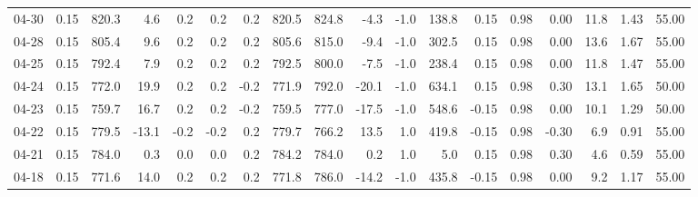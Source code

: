 \begin{threeparttable}
{\begin{tabular}{lrrrrrrrrrrrrrrrrr}
  04-30 &     0.15 & 820.3 &               4.6 &               0.2 &                0.2 &                0.2 & 820.5 & 824.8 &       -4.3 &                     -1.0 &               138.8 &       0.15 &      0.98 &           0.00 &             11.8 &            1.43 &                  55.00 \\
  04-28 &     0.15 & 805.4 &               9.6 &               0.2 &                0.2 &                0.2 & 805.6 & 815.0 &       -9.4 &                     -1.0 &               302.5 &       0.15 &      0.98 &           0.00 &             13.6 &            1.67 &                  55.00 \\
  04-25 &     0.15 & 792.4 &               7.9 &               0.2 &                0.2 &                0.2 & 792.5 & 800.0 &       -7.5 &                     -1.0 &               238.4 &       0.15 &      0.98 &           0.00 &             11.8 &            1.47 &                  55.00 \\
  04-24 &     0.15 & 772.0 &              19.9 &               0.2 &                0.2 &               -0.2 & 771.9 & 792.0 &      -20.1 &                     -1.0 &               634.1 &       0.15 &      0.98 &           0.30 &             13.1 &            1.65 &                  50.00 \\
  04-23 &     0.15 & 759.7 &              16.7 &               0.2 &                0.2 &               -0.2 & 759.5 & 777.0 &      -17.5 &                     -1.0 &               548.6 &      -0.15 &      0.98 &           0.00 &             10.1 &            1.29 &                  50.00 \\
  04-22 &     0.15 & 779.5 &             -13.1 &              -0.2 &               -0.2 &                0.2 & 779.7 & 766.2 &       13.5 &                      1.0 &               419.8 &      -0.15 &      0.98 &          -0.30 &              6.9 &            0.91 &                  55.00 \\
  04-21 &     0.15 & 784.0 &               0.3 &               0.0 &                0.0 &                0.2 & 784.2 & 784.0 &        0.2 &                      1.0 &                 5.0 &       0.15 &      0.98 &           0.30 &              4.6 &            0.59 &                  55.00 \\
  04-18 &     0.15 & 771.6 &              14.0 &               0.2 &                0.2 &                0.2 & 771.8 & 786.0 &      -14.2 &                     -1.0 &               435.8 &      -0.15 &      0.98 &           0.00 &              9.2 &            1.17 &                  55.00 \\

\end{tabular}}
\end{threeparttable}
